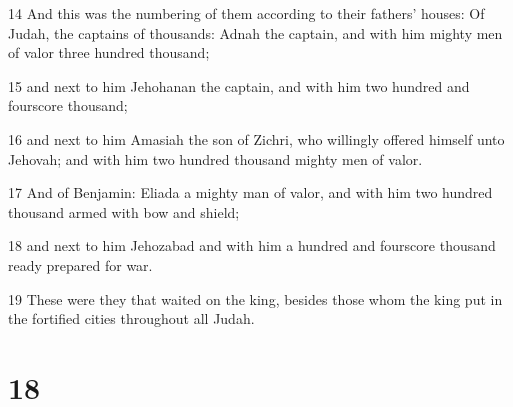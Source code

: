 \par 14 And this was the numbering of them according to their fathers' houses: Of Judah, the captains of thousands: Adnah the captain, and with him mighty men of valor three hundred thousand;
\par 15 and next to him Jehohanan the captain, and with him two hundred and fourscore thousand;
\par 16 and next to him Amasiah the son of Zichri, who willingly offered himself unto Jehovah; and with him two hundred thousand mighty men of valor.
\par 17 And of Benjamin: Eliada a mighty man of valor, and with him two hundred thousand armed with bow and shield;
\par 18 and next to him Jehozabad and with him a hundred and fourscore thousand ready prepared for war.
\par 19 These were they that waited on the king, besides those whom the king put in the fortified cities throughout all Judah.

\chapter{18}

